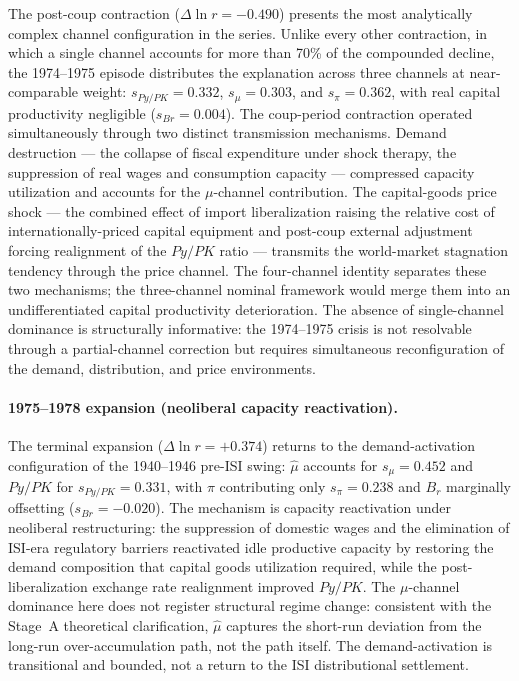 \documentclass[11pt,a4paper]{article}
\begin{document}
{The post-coup contraction ($\Delta\ln r = -0.490$) presents the most
analytically complex channel configuration in the series. Unlike every
other contraction, in which a single channel accounts for more than 70\%
of the compounded decline, the 1974--1975 episode distributes the
explanation across three channels at near-comparable weight: $s_{Py/PK} =
0.332$, $s_\mu = 0.303$, and $s_\pi = 0.362$, with real capital
productivity negligible ($s_{Br} = 0.004$). The coup-period contraction
operated simultaneously through two distinct transmission mechanisms.
Demand destruction --- the collapse of fiscal expenditure under shock
therapy, the suppression of real wages and consumption capacity ---
compressed capacity utilization and accounts for the $\mu$-channel
contribution. The capital-goods price shock --- the combined effect of
import liberalization raising the relative cost of internationally-priced
capital equipment and post-coup external adjustment forcing realignment of
the $Py/PK$ ratio --- transmits the world-market stagnation tendency through
the price channel. The four-channel identity separates these two mechanisms;
the three-channel nominal framework would merge them into an undifferentiated
capital productivity deterioration. The absence of single-channel dominance
is structurally informative: the 1974--1975 crisis is not resolvable through
a partial-channel correction but requires simultaneous reconfiguration of
the demand, distribution, and price environments.

\paragraph{1975--1978 expansion (neoliberal capacity reactivation).}

The terminal expansion ($\Delta\ln r = +0.374$) returns to the
demand-activation configuration of the 1940--1946 pre-ISI swing:
$\hat{\mu}$ accounts for $s_\mu = 0.452$ and $Py/PK$ for $s_{Py/PK} =
0.331$, with $\pi$ contributing only $s_\pi = 0.238$ and $B_r$ marginally
offsetting ($s_{Br} = -0.020$). The mechanism is capacity reactivation
under neoliberal restructuring: the suppression of domestic wages and the
elimination of ISI-era regulatory barriers reactivated idle productive
capacity by restoring the demand composition that capital goods utilization
required, while the post-liberalization exchange rate realignment improved
$Py/PK$. The $\mu$-channel dominance here does not register structural
regime change: consistent with the Stage~A theoretical clarification,
$\hat{\mu}$ captures the short-run deviation from the long-run
over-accumulation path, not the path itself. The demand-activation is
transitional and bounded, not a return to the ISI distributional settlement.

}
\end{document}
